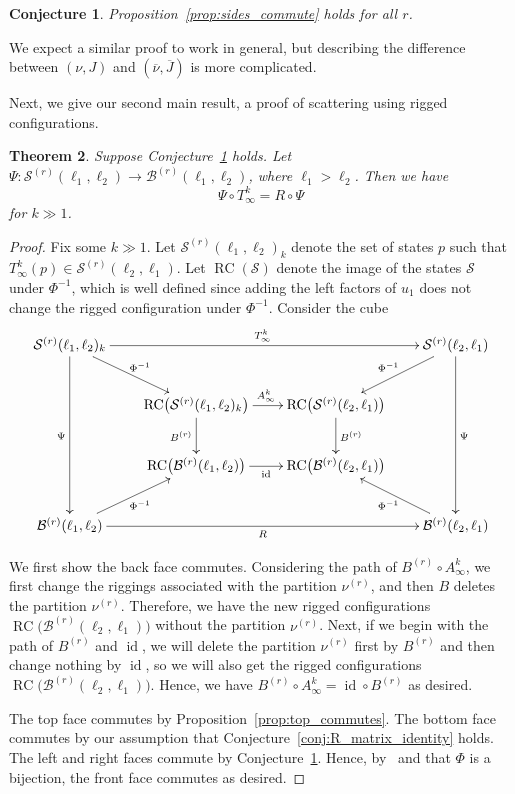 \documentclass[reqno]{amsart}
\newcommand{\Sol}{\mathcal{S}} %
\newcommand{\modgamma}{\check{\gamma}} %
\DeclareMathOperator{\RC}{RC} %
\DeclareMathOperator{\id}{id} %
\newcommand{\ZZ}{\mathbb{Z}}
\theoremstyle{plain}
\newtheorem{thm}{Theorem}[section]
\newtheorem{conj}[thm]{Conjecture}
\theoremstyle{definition}
\numberwithin{equation}{section}
\begin{document}
\begin{conj}
\label{conj:sides_commute}
Proposition~\ref{prop:sides_commute} holds for all $r$. %
\end{conj}

We expect a similar proof to work in general, but describing the difference between $(\nu, J)$ and $(\overline{\nu}, \overline{J})$ is more complicated.

Next, we give our second main result, a proof of scattering using rigged configurations.

\begin{thm}
\label{thm:RC_scattering}
Suppose Conjecture~\ref{conj:sides_commute} holds.
Let $\Psi \colon \Sol^{(r)}(\ell_1, \ell_2) \to \mathcal{B}^{(r)}(\ell_1, \ell_2)$, where $\ell_1 > \ell_2$.
Then we have
\[
\Psi \circ T_{\infty}^k = R \circ \Psi
\]
for $k \gg 1$.
\end{thm}

\begin{proof}
Fix some $k \gg 1$.
Let $\Sol^{(r)}(\ell_1, \ell_2)_k$ denote the set of states $p$ such that $T_{\infty}^k(p) \in \Sol^{(r)}(\ell_2, \ell_1)$.
Let $\RC(\Sol)$ denote the image of the states $\Sol$ under $\Phi^{-1}$, which is well defined since adding the left factors of $u_1$ does not change the rigged configuration under $\Phi^{-1}$.
Consider the cube
\[
\xymatrixcolsep{2.1em}
\xymatrixrowsep{2.5em}
\xymatrix{
\Sol^{(r)}(\ell_1, \ell_2)_k \ar[rrr]^{T_{\infty}^k} \ar[ddd]_{\Psi} \ar[dr]^{\Phi^{-1}} & & & \Sol^{(r)}(\ell_2, \ell_1) \ar[ddd]^{\Psi} \ar[dl]_{\Phi^{-1}}
\\ & \RC\bigl( \Sol^{(r)}(\ell_1, \ell_2)_k \bigr) \ar[r]^{A_{\infty}^k} \ar[d]_{B^{(r)}} & \RC\bigl( \Sol^{(r)}(\ell_2, \ell_1) \bigr) \ar[d]^{B^{(r)}} &
\\ & \RC\bigl( \mathcal{B}^{(r)}(\ell_1,\ell_2) \bigr) \ar[r]_{\operatorname{id}} & \RC\bigl( \mathcal{B}^{(r)}(\ell_2,\ell_1) \bigr) &
\\ \mathcal{B}^{(r)}(\ell_1,\ell_2) \ar[rrr]_{R} \ar[ur]_{\Phi^{-1}} & & & \mathcal{B}^{(r)}(\ell_2,\ell_1) \ar[ul]^{\Phi^{-1}}
}
\]

We first show the back face commutes.
Considering the path of $B^{(r)} \circ A_{\infty}^k$, we first change the riggings associated with the partition $\nu^{(r)}$, and then $B$ deletes the partition $\nu^{(r)}$.
Therefore, we have the new rigged configurations $\RC\bigl( \mathcal{B}^{(r)}(\ell_2,\ell_1) \bigr)$ without  the partition $\nu^{(r)}$.
Next, if we begin with the path of $B^{(r)}$ and $\id$, we will delete the partition $\nu^{(r)}$ first by $B^{(r)}$ and then change nothing by $\id$, so we will also get the rigged configurations $\RC\bigl( \mathcal{B}^{(r)}(\ell_2,\ell_1) \bigr)$.
Hence, we have $B^{(r)} \circ A_{\infty}^k = \id \circ B^{(r)}$ as desired.

The top face commutes by Proposition~\ref{prop:top_commutes}.
The bottom face commutes by our assumption that Conjecture~\ref{conj:R_matrix_identity} holds.
The left and right faces commute by Conjecture~\ref{conj:sides_commute}.
Hence, by~\cite[Lemma~5.3]{KSS02} and that $\Phi$ is a bijection, the front face commutes as desired.
\end{proof}
\end{document}
